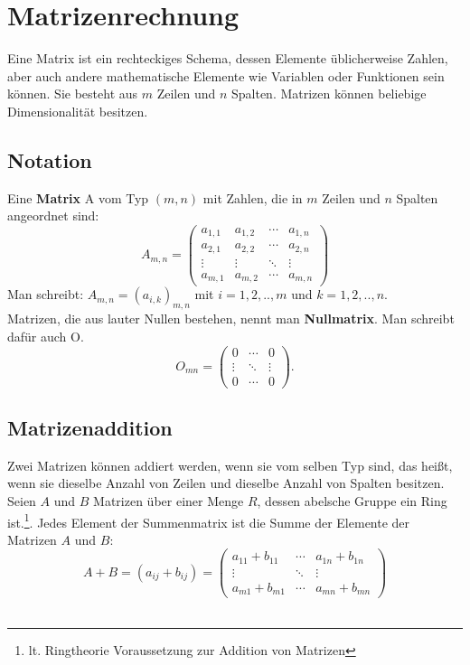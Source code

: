 \documentclass[a4paper,10pt,DIV9, BCOR12mm, oneside,openright,openbib]{scrreprt}
\theoremstyle{definition}
\theoremstyle{plain}
\begin{document}
 \section{Matrizenrechnung}
Eine Matrix ist ein rechteckiges Schema, dessen Elemente üblicherweise Zahlen, aber auch andere mathematische Elemente wie Variablen oder Funktionen sein können. Sie besteht aus $m$ Zeilen und $n$ Spalten. Matrizen können beliebige Dimensionalität besitzen.
\subsection{Notation}
Eine \textbf{Matrix} A vom Typ $(m,n)$ mit Zahlen, die in $m$ Zeilen und $n$ Spalten angeordnet sind:
\[A_{m,n} =
 \begin{pmatrix}
  a_{1,1} & a_{1,2} & \cdots & a_{1,n} \\
  a_{2,1} & a_{2,2} & \cdots & a_{2,n} \\
  \vdots  & \vdots  & \ddots & \vdots  \\
  a_{m,1} & a_{m,2} & \cdots & a_{m,n}
 \end{pmatrix}\]
 Man schreibt: $A_{m,n} = (a_{i,k})_{m,n} $ mit $i= 1,2,..,m$ und $k= 1,2,..,n$.
\\[5ex]
 Matrizen, die aus lauter Nullen bestehen, nennt man \textbf{Nullmatrix}. Man schreibt dafür auch O.
\[ O_{mn} = \begin{pmatrix} 0 & \cdots & 0 \\ \vdots & \ddots & \vdots \\ 0 & \cdots & 0 \end{pmatrix}.\]
\subsection{Matrizenaddition}
Zwei Matrizen können addiert werden, wenn sie vom selben Typ sind, das heißt, wenn sie dieselbe Anzahl von Zeilen und dieselbe Anzahl von Spalten besitzen. 
Seien $A$ und $B$ Matrizen über einer Menge $R$, dessen abelsche Gruppe ein Ring ist.\footnote{lt. Ringtheorie Voraussetzung zur Addition von Matrizen\cite{Artin1998}}. Jedes Element der Summenmatrix ist die Summe der Elemente der Matrizen $A$ und $B$: 
\[ A + B = ( a_{ij} + b_{ij} ) = \begin{pmatrix} a_{11} + b_{11} & \cdots & a_{1n} + b_{1n} \\ \vdots & \ddots & \vdots \\ a_{m1} + b_{m1} & \cdots & a_{mn} + b_{mn} \end{pmatrix} \]
\\[5ex]
\end{document}
